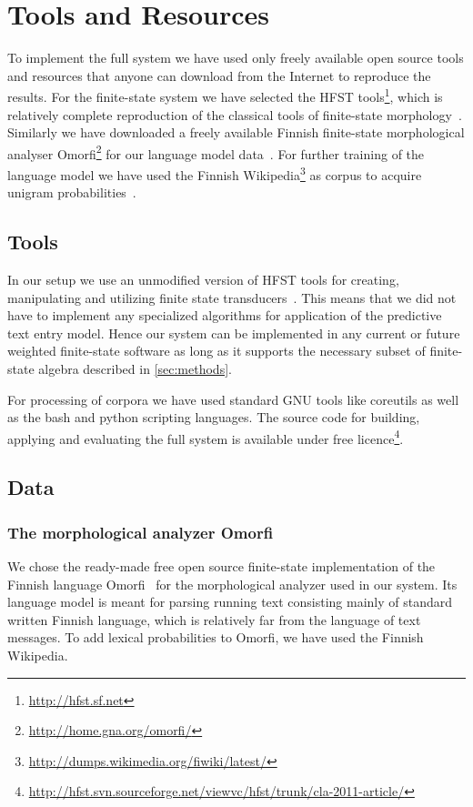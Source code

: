\documentclass[a4paper,conference]{IEEEtran}
\begin{document}
\section{Tools and Resources}
\label{sec:tools}

To implement the full system we have used only freely available open
source tools and resources that anyone can download from the Internet
to reproduce the results. For the finite-state system we have selected
the HFST tools\footnote{\url{http://hfst.sf.net}}, which is relatively
complete reproduction of the classical tools of finite-state
morphology~\cite{beesley/2003}. Similarly we have downloaded a freely
available Finnish finite-state morphological analyser
Omorfi\footnote{\url{http://home.gna.org/omorfi/}} for our language
model data~\cite{pirinen/2011/nodalida}. For further training of the
language model we have used the Finnish
Wikipedia\footnote{\url{http://dumps.wikimedia.org/fiwiki/latest/}} as
corpus to acquire unigram probabilities~\cite{pirinen/2010/lrec}.

\subsection{Tools}

In our setup we use an unmodified version of HFST tools for creating,
manipulating and utilizing finite state
transducers~\cite{hfst/2011}. This means that we did not have to
implement any specialized algorithms for application of the predictive
text entry model. Hence our system can be implemented in any current
or future weighted finite-state software as long as it supports the
necessary subset of finite-state algebra described in
\ref{sec:methods}.

For processing of corpora we have used standard GNU tools like
coreutils as well as the bash and python scripting languages. The
source code for building, applying and evaluating the full system is
available under free
licence\footnote{\url{http://hfst.svn.sourceforge.net/viewvc/hfst/trunk/cla-2011-article/}}.

\subsection{Data}
\label{sec:data}

\subsubsection{The morphological analyzer Omorfi} 
We chose the ready-made free open source finite-state implementation
of the Finnish language Omorfi~\cite{pirinen/2011/nodalida} for the
morphological analyzer used in our system.  Its language model is
meant for parsing running text consisting mainly of standard written
Finnish language, which is relatively far from the language of text
messages. To add lexical probabilities to Omorfi, we have used the
Finnish Wikipedia.
\end{document}
